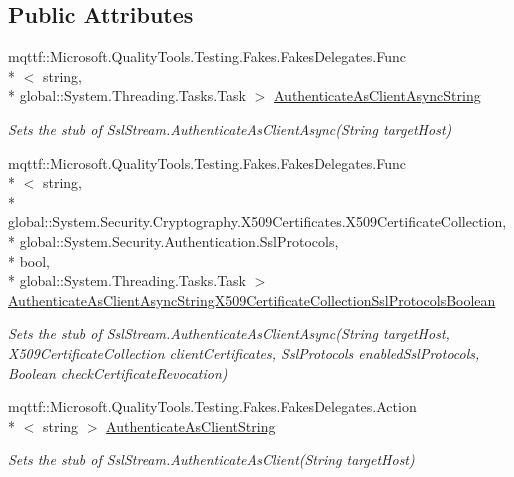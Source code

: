 \subsection*{Public Attributes}
\begin{DoxyCompactItemize}
\item 
mqttf\-::\-Microsoft.\-Quality\-Tools.\-Testing.\-Fakes.\-Fakes\-Delegates.\-Func\\*
$<$ string, \\*
global\-::\-System.\-Threading.\-Tasks.\-Task $>$ \hyperlink{class_system_1_1_net_1_1_security_1_1_fakes_1_1_stub_ssl_stream_a0531d6a062fc093effbab9e2b07067e4}{Authenticate\-As\-Client\-Async\-String}
\begin{DoxyCompactList}\small\item\em Sets the stub of Ssl\-Stream.\-Authenticate\-As\-Client\-Async(\-String target\-Host)\end{DoxyCompactList}\item 
mqttf\-::\-Microsoft.\-Quality\-Tools.\-Testing.\-Fakes.\-Fakes\-Delegates.\-Func\\*
$<$ string, \\*
global\-::\-System.\-Security.\-Cryptography.\-X509\-Certificates.\-X509\-Certificate\-Collection, \\*
global\-::\-System.\-Security.\-Authentication.\-Ssl\-Protocols, \\*
bool, \\*
global\-::\-System.\-Threading.\-Tasks.\-Task $>$ \hyperlink{class_system_1_1_net_1_1_security_1_1_fakes_1_1_stub_ssl_stream_a197e7d65b3f851425fe846a6aa3f3bd1}{Authenticate\-As\-Client\-Async\-String\-X509\-Certificate\-Collection\-Ssl\-Protocols\-Boolean}
\begin{DoxyCompactList}\small\item\em Sets the stub of Ssl\-Stream.\-Authenticate\-As\-Client\-Async(\-String target\-Host, X509\-Certificate\-Collection client\-Certificates, Ssl\-Protocols enabled\-Ssl\-Protocols, Boolean check\-Certificate\-Revocation)\end{DoxyCompactList}\item 
mqttf\-::\-Microsoft.\-Quality\-Tools.\-Testing.\-Fakes.\-Fakes\-Delegates.\-Action\\*
$<$ string $>$ \hyperlink{class_system_1_1_net_1_1_security_1_1_fakes_1_1_stub_ssl_stream_af4906fc30954ebacd34ec89df08d3d03}{Authenticate\-As\-Client\-String}
\begin{DoxyCompactList}\small\item\em Sets the stub of Ssl\-Stream.\-Authenticate\-As\-Client(\-String target\-Host)\end{DoxyCompactList}\item 

\end{DoxyCompactItemize}
